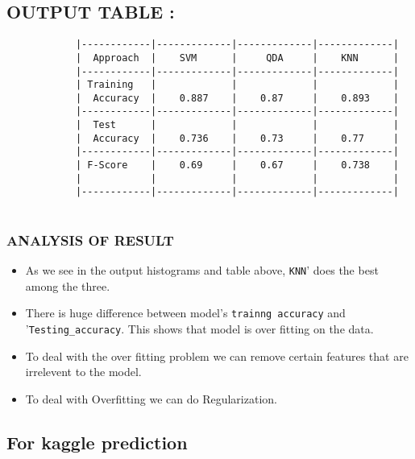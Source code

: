 \documentclass[11pt]{article}
\begin{document}
    \hypertarget{output-table}{%
\subsection{OUTPUT TABLE :}\label{output-table}}

\begin{verbatim}
            |------------|-------------|-------------|-------------|
            |  Approach  |    SVM      |     QDA     |    KNN      |
            |------------|-------------|-------------|-------------|
            | Training   |             |             |             |
            |  Accuracy  |    0.887    |    0.87     |    0.893    |
            |------------|-------------|-------------|-------------|
            |  Test      |             |             |             |
            |  Accuracy  |    0.736    |    0.73     |    0.77     |
            |------------|-------------|-------------|-------------|
            | F-Score    |    0.69     |    0.67     |    0.738    |
            |            |             |             |             |
            |------------|-------------|-------------|-------------|
            
\end{verbatim}

    \hypertarget{analysis-of-result}{%
\subsubsection{ANALYSIS OF RESULT}\label{analysis-of-result}}

\begin{itemize}
\item
  As we see in the output histograms and table above,
  \texttt{\textquotesingle{}KNN}' does the best among the three.
\item
  There is huge difference between model's
  \texttt{\textquotesingle{}trainng\ accuracy\textquotesingle{}} and
  '\texttt{Testing\_accuracy\textquotesingle{}}. This shows that model
  is over fitting on the data.
\item
  To deal with the over fitting problem we can remove certain features
  that are irrelevent to the model.
\item
  To deal with Overfitting we can do Regularization.
\end{itemize}

    \hypertarget{for-kaggle-prediction}{%
\subsection{For kaggle prediction}\label{for-kaggle-prediction}}
\end{document}

